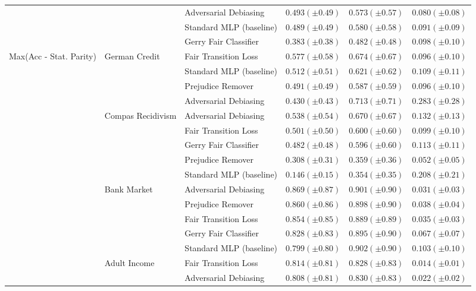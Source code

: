 \begin{tabular}{llllll}
 &  & Adversarial Debiasing & $0.493 (\pm0.49)$ & $0.573 (\pm0.57)$ & $0.080 (\pm0.08)$ \\
 &  & Standard MLP (baseline) & $0.489 (\pm0.49)$ & $0.580 (\pm0.58)$ & $0.091 (\pm0.09)$ \\
 &  & Gerry Fair Classifier & $0.383 (\pm0.38)$ & $0.482 (\pm0.48)$ & $0.098 (\pm0.10)$ \\
\cline{1-6} \cline{2-6}
\multirow[t]{19}{*}{Max(Acc - Stat. Parity)} & \multirow[t]{4}{*}{German Credit} & Fair Transition Loss & $0.577 (\pm0.58)$ & $0.674 (\pm0.67)$ & $0.096 (\pm0.10)$ \\
 &  & Standard MLP (baseline) & $0.512 (\pm0.51)$ & $0.621 (\pm0.62)$ & $0.109 (\pm0.11)$ \\
 &  & Prejudice Remover & $0.491 (\pm0.49)$ & $0.587 (\pm0.59)$ & $0.096 (\pm0.10)$ \\
 &  & Adversarial Debiasing & $0.430 (\pm0.43)$ & $0.713 (\pm0.71)$ & $0.283 (\pm0.28)$ \\
\cline{2-6}
 & \multirow[t]{5}{*}{Compas Recidivism} & Adversarial Debiasing & $0.538 (\pm0.54)$ & $0.670 (\pm0.67)$ & $0.132 (\pm0.13)$ \\
 &  & Fair Transition Loss & $0.501 (\pm0.50)$ & $0.600 (\pm0.60)$ & $0.099 (\pm0.10)$ \\
 &  & Gerry Fair Classifier & $0.482 (\pm0.48)$ & $0.596 (\pm0.60)$ & $0.113 (\pm0.11)$ \\
 &  & Prejudice Remover & $0.308 (\pm0.31)$ & $0.359 (\pm0.36)$ & $0.052 (\pm0.05)$ \\
 &  & Standard MLP (baseline) & $0.146 (\pm0.15)$ & $0.354 (\pm0.35)$ & $0.208 (\pm0.21)$ \\
\cline{2-6}
 & \multirow[t]{5}{*}{Bank Market} & Adversarial Debiasing & $0.869 (\pm0.87)$ & $0.901 (\pm0.90)$ & $0.031 (\pm0.03)$ \\
 &  & Prejudice Remover & $0.860 (\pm0.86)$ & $0.898 (\pm0.90)$ & $0.038 (\pm0.04)$ \\
 &  & Fair Transition Loss & $0.854 (\pm0.85)$ & $0.889 (\pm0.89)$ & $0.035 (\pm0.03)$ \\
 &  & Gerry Fair Classifier & $0.828 (\pm0.83)$ & $0.895 (\pm0.90)$ & $0.067 (\pm0.07)$ \\
 &  & Standard MLP (baseline) & $0.799 (\pm0.80)$ & $0.902 (\pm0.90)$ & $0.103 (\pm0.10)$ \\
\cline{2-6}
 & \multirow[t]{5}{*}{Adult Income} & Fair Transition Loss & $0.814 (\pm0.81)$ & $0.828 (\pm0.83)$ & $0.014 (\pm0.01)$ \\
 &  & Adversarial Debiasing & $0.808 (\pm0.81)$ & $0.830 (\pm0.83)$ & $0.022 (\pm0.02)$ \\

\end{tabular}
